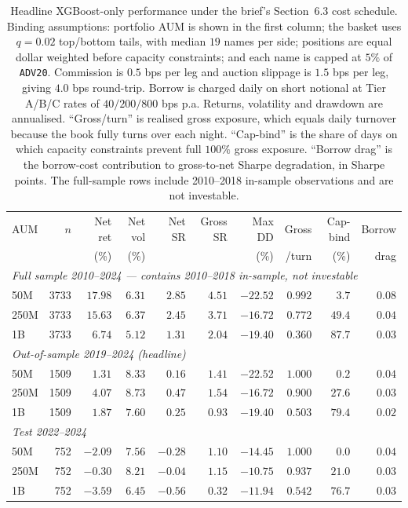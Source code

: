 \documentclass[12pt]{article}
\begin{document}
\begin{table}[H]
  \centering
  \footnotesize
  \setlength{\tabcolsep}{4.5pt}
  \begin{tabular}{lrrrrrrrrr}
    \toprule
    AUM & $n$ & Net ret & Net vol & Net SR & Gross SR & Max DD & Gross & Cap-bind & Borrow \\
        &     & (\%)    & (\%)    &        &          & (\%)   & /turn & (\%)     & drag \\
    \midrule
    \multicolumn{10}{l}{\textit{Full sample 2010--2024 --- contains 2010--2018 in-sample, not investable}}\\
    50M  & 3733 & $17.98$ & $6.31$ & $2.85$ & $4.51$ & $-22.52$ & $0.992$ & $3.7$  & $0.08$ \\
    250M & 3733 & $15.63$ & $6.37$ & $2.45$ & $3.71$ & $-16.72$ & $0.772$ & $49.4$ & $0.04$ \\
    1B   & 3733 & $6.74$  & $5.12$ & $1.31$ & $2.04$ & $-19.40$ & $0.360$ & $87.7$ & $0.03$ \\
    \midrule
    \multicolumn{10}{l}{\textit{Out-of-sample 2019--2024 (headline)}}\\
    50M  & 1509 & $1.31$  & $8.33$ & $0.16$  & $1.41$ & $-22.52$ & $1.000$ & $0.2$  & $0.04$ \\
    250M & 1509 & $4.07$  & $8.73$ & $0.47$  & $1.54$ & $-16.72$ & $0.900$ & $27.6$ & $0.03$ \\
    1B   & 1509 & $1.87$  & $7.60$ & $0.25$  & $0.93$ & $-19.40$ & $0.503$ & $79.4$ & $0.02$ \\
    \midrule
    \multicolumn{10}{l}{\textit{Test 2022--2024}}\\
    50M  & 752 & $-2.09$ & $7.56$ & $-0.28$ & $1.10$ & $-14.45$ & $1.000$ & $0.0$  & $0.04$ \\
    250M & 752 & $-0.30$ & $8.21$ & $-0.04$ & $1.15$ & $-10.75$ & $0.937$ & $21.0$ & $0.03$ \\
    1B   & 752 & $-3.59$ & $6.45$ & $-0.56$ & $0.32$ & $-11.94$ & $0.542$ & $76.7$ & $0.03$ \\
    \bottomrule
  \end{tabular}
  \caption{Headline XGBoost-only performance under the brief's Section~6.3 cost schedule.
  Binding assumptions: portfolio AUM is shown in the first column; the basket uses $q=0.02$
  top/bottom tails, with median $19$ names per side; positions are equal dollar weighted
  before capacity constraints; and each name is capped at $5\%$ of \texttt{ADV20}.
  Commission is $0.5$ bps per leg and auction slippage is $1.5$ bps per leg, giving $4.0$
  bps round-trip. Borrow is charged daily on short notional at Tier A/B/C rates of
  $40/200/800$ bps p.a. Returns, volatility and drawdown are annualised. ``Gross/turn'' is
  realised gross exposure, which equals daily turnover because the book fully turns over
  each night. ``Cap-bind'' is the share of days on which capacity constraints prevent full
  $100\%$ gross exposure. ``Borrow drag'' is the borrow-cost contribution to gross-to-net
  Sharpe degradation, in Sharpe points. The full-sample rows include 2010--2018 in-sample
  observations and are not investable.}
  \label{tab:step5-headline}
\end{table}
\end{document}
